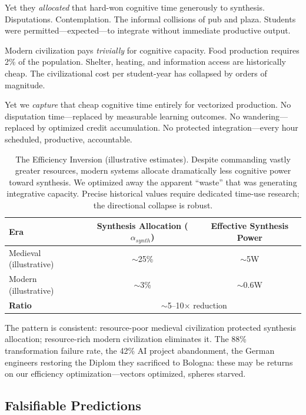 Yet they \textit{allocated} that hard-won cognitive time generously to synthesis. Disputations. Contemplation. The informal collisions of pub and plaza. Students were permitted—expected—to integrate without immediate productive output.

Modern civilization pays \textit{trivially} for cognitive capacity. Food production requires 2\% of the population. Shelter, heating, and information access are historically cheap. The civilizational cost per student-year has collapsed by orders of magnitude.

Yet we \textit{capture} that cheap cognitive time entirely for vectorized production. No disputation time—replaced by measurable learning outcomes. No wandering—replaced by optimized credit accumulation. No protected integration—every hour scheduled, productive, accountable.

\begin{table}[htbp]
\centering
\begin{tabular}{lcc}
\toprule
\textbf{Era} & \textbf{Synthesis Allocation ($\alpha_{synth}$)} & \textbf{Effective Synthesis Power} \\
\midrule
Medieval (illustrative) & $\sim$25\% & $\sim$5W \\
Modern (illustrative) & $\sim$3\% & $\sim$0.6W \\
\midrule
\textbf{Ratio} & \multicolumn{2}{c}{$\sim$5--10$\times$ reduction} \\
\bottomrule
\end{tabular}
\caption{The Efficiency Inversion (illustrative estimates). Despite commanding vastly greater resources, modern systems allocate dramatically less cognitive power toward synthesis. We optimized away the apparent ``waste'' that was generating integrative capacity. Precise historical values require dedicated time-use research; the directional collapse is robust.}
\label{tab:efficiency-inversion}
\end{table}

The pattern is consistent: resource-poor medieval civilization protected synthesis allocation; resource-rich modern civilization eliminates it. The 88\% transformation failure rate, the 42\% AI project abandonment, the German engineers restoring the Diplom they sacrificed to Bologna: these may be returns on our efficiency optimization—vectors optimized, spheres starved.

\subsection{Falsifiable Predictions}

